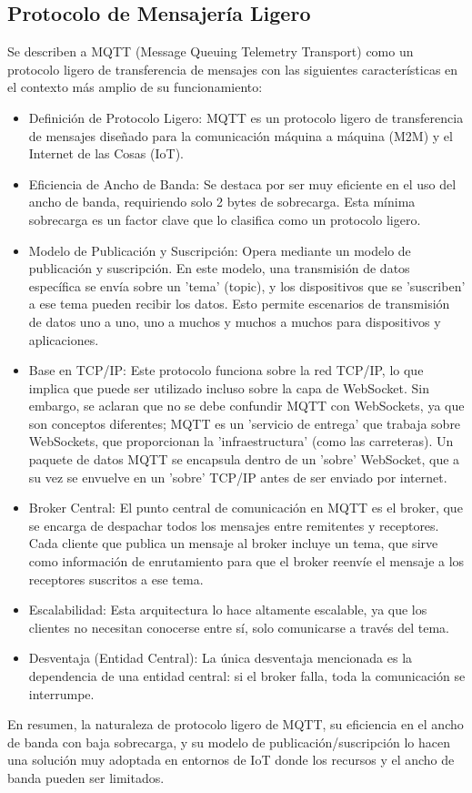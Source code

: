 \documentclass{report}
\begin{document}
\subsection{Protocolo de Mensajería Ligero}
Se describen a MQTT (Message Queuing Telemetry Transport) como un protocolo ligero de transferencia de mensajes con las siguientes 
características en el contexto más amplio de su funcionamiento:
\begin{itemize}
    \item Definición de Protocolo Ligero: MQTT es un protocolo ligero de transferencia de mensajes diseñado para la comunicación máquina 
    a máquina (M2M) y el Internet de las Cosas (IoT).
    \item Eficiencia de Ancho de Banda: Se destaca por ser muy eficiente en el uso del ancho de banda, requiriendo solo 2 bytes de sobrecarga. 
    Esta mínima sobrecarga es un factor clave que lo clasifica como un protocolo ligero.
    \item Modelo de Publicación y Suscripción: Opera mediante un modelo de publicación y suscripción. En este modelo, una transmisión de datos 
    específica se envía sobre un 'tema' (topic), y los dispositivos que se 'suscriben' a ese tema pueden recibir los datos. Esto permite 
    escenarios de transmisión de datos uno a uno, uno a muchos y muchos a muchos para dispositivos y aplicaciones.
    \item Base en TCP/IP: Este protocolo funciona sobre la red TCP/IP, lo que implica que puede ser utilizado incluso sobre la capa de 
    WebSocket. Sin embargo, se  aclaran que no se debe confundir MQTT con WebSockets, ya que son conceptos diferentes; MQTT es 
    un 'servicio de entrega' que trabaja sobre WebSockets, que proporcionan la 'infraestructura' (como las carreteras). Un paquete de datos 
    MQTT se encapsula dentro de un 'sobre' WebSocket, que a su vez se envuelve en un 'sobre' TCP/IP antes de ser enviado por internet.
    \item Broker Central: El punto central de comunicación en MQTT es el broker, que se encarga de despachar todos los mensajes entre 
    remitentes y receptores. Cada cliente que publica un mensaje al broker incluye un tema, que sirve como información de enrutamiento 
    para que el broker reenvíe el mensaje a los receptores suscritos a ese tema.
    \item Escalabilidad: Esta arquitectura lo hace altamente escalable, ya que los clientes no necesitan conocerse entre sí, solo comunicarse 
    a través del tema.
    \item Desventaja (Entidad Central): La única desventaja mencionada es la dependencia de una entidad central: si el broker falla, toda la 
    comunicación se interrumpe.
\end{itemize}
En resumen, la naturaleza de protocolo ligero de MQTT, su eficiencia en el ancho de banda con baja sobrecarga, y su modelo de 
publicación/suscripción lo hacen una solución muy adoptada en entornos de IoT donde los recursos y el ancho de banda pueden ser limitados.
\end{document}
